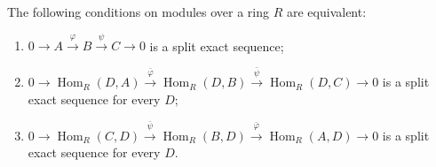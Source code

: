 The following conditions on modules over a ring $R$ are equivalent:
\begin{enumerate}
\item[(i)] $0 \to A \xrightarrow{\varphi} B \xrightarrow{\psi} C \to 0$ is a split exact sequence;
\item[(ii)] $0 \to \operatorname{Hom}_R(D,A) \xrightarrow{\bar{\varphi}} \operatorname{Hom}_R(D,B) \xrightarrow{\bar{\psi}} \operatorname{Hom}_R(D,C) \to 0$ is a split exact sequence for every $D$;
\item[(iii)] $0 \to \operatorname{Hom}_R(C,D) \xrightarrow{\bar{\psi}} \operatorname{Hom}_R(B,D) \xrightarrow{\bar{\varphi}} \operatorname{Hom}_R(A,D) \to 0$ is a split exact sequence for every $D$.
\end{enumerate}
